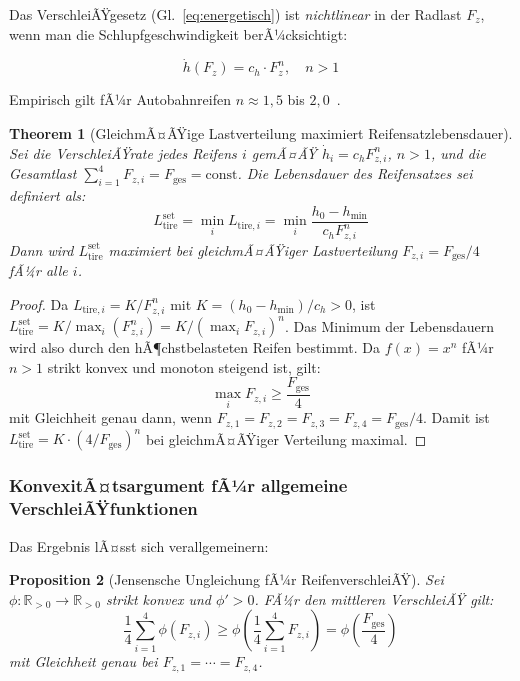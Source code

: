 ﻿\documentclass[12pt,a4paper]{article}
\newtheorem{theorem}{Theorem}[section]
\newtheorem{proposition}[theorem]{Proposition}
\theoremstyle{definition}
\theoremstyle{remark}
\newcommand{\Ltire}{L_{\mathrm{tire}}}
\newcommand{\Fz}{F_z}
\newcommand{\R}{\mathbb{R}}
\begin{document}
Das VerschleiÃŸgesetz (Gl.~\ref{eq:energetisch}) ist \emph{nichtlinear} in der
Radlast $\Fz$, wenn man die Schlupfgeschwindigkeit berÃ¼cksichtigt:

\begin{equation}
  \dot{h}(\Fz) = c_h \cdot \Fz^n, \quad n > 1
  \label{eq:wear_fz}
\end{equation}

Empirisch gilt fÃ¼r Autobahnreifen $n \approx 1{,}5$ bis $2{,}0$~\cite{Niskanen2014,
Williams1955}.

\begin{theorem}[GleichmÃ¤ÃŸige Lastverteilung maximiert Reifensatzlebensdauer]
\label{thm:load_even}
Sei die VerschleiÃŸrate jedes Reifens $i$ gemÃ¤ÃŸ $\dot{h}_i = c_h F_{z,i}^n$,
$n > 1$, und die Gesamtlast $\sum_{i=1}^4 F_{z,i} = F_{\mathrm{ges}} = \mathrm{const}$.
Die Lebensdauer des Reifensatzes sei definiert als:
\begin{equation}
  \Ltire^{\mathrm{set}} = \min_i L_{\mathrm{tire},i}
                        = \min_i \frac{h_0 - h_{\min}}{c_h F_{z,i}^n}
  \label{eq:life_set}
\end{equation}
Dann wird $\Ltire^{\mathrm{set}}$ maximiert bei gleichmÃ¤ÃŸiger Lastverteilung
$F_{z,i} = F_{\mathrm{ges}} / 4$ fÃ¼r alle $i$.
\end{theorem}

\begin{proof}
Da $L_{\mathrm{tire},i} = K / F_{z,i}^n$ mit $K = (h_0 - h_{\min}) / c_h > 0$, ist
$\Ltire^{\mathrm{set}} = K / \max_i(F_{z,i}^n) = K / (\max_i F_{z,i})^n$.
Das Minimum der Lebensdauern wird also durch den hÃ¶chstbelasteten Reifen
bestimmt. Da $f(x) = x^n$ fÃ¼r $n > 1$ strikt konvex und monoton steigend ist,
gilt:
\begin{equation}
  \max_i F_{z,i} \geq \frac{F_{\mathrm{ges}}}{4}
\end{equation}
mit Gleichheit genau dann, wenn $F_{z,1} = F_{z,2} = F_{z,3} = F_{z,4} = F_{\mathrm{ges}}/4$.
Damit ist $\Ltire^{\mathrm{set}} = K \cdot (4/F_{\mathrm{ges}})^n$ bei
gleichmÃ¤ÃŸiger Verteilung maximal.
\end{proof}

\subsubsection{KonvexitÃ¤tsargument fÃ¼r allgemeine VerschleiÃŸfunktionen}

Das Ergebnis lÃ¤sst sich verallgemeinern:

\begin{proposition}[Jensensche Ungleichung fÃ¼r ReifenverschleiÃŸ]
\label{prop:jensen}
Sei $\phi : \R_{>0} \to \R_{>0}$ strikt konvex und $\phi' > 0$.
FÃ¼r den mittleren VerschleiÃŸ gilt:
\begin{equation}
  \frac{1}{4}\sum_{i=1}^4 \phi(F_{z,i}) \geq \phi\!\left(\frac{1}{4}\sum_{i=1}^4 F_{z,i}\right)
    = \phi\!\left(\frac{F_{\mathrm{ges}}}{4}\right)
  \label{eq:jensen}
\end{equation}
mit Gleichheit genau bei $F_{z,1} = \cdots = F_{z,4}$.
\end{proposition}
\end{document}

